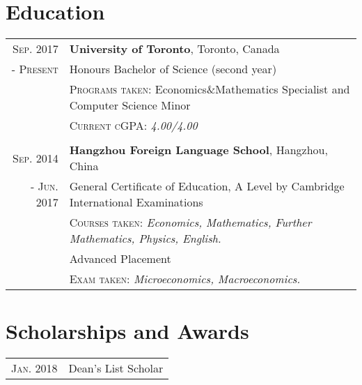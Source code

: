 \documentclass[a4paper,10pt]{article}
\begin{document}
\section{Education}
\begin{tabular}{rl}

    \textsc{Sep.} 2017 & \textbf{University of Toronto}, Toronto, Canada \\
    - \textsc{Present} & {Honours Bachelor of Science} (second year) \\
    & \quad \textsc{Programs taken: } Economics\&Mathematics Specialist and Computer Science Minor \\
    & \quad \textsc{Current cGPA: } \emph{4.00/4.00} 
    \\
    \quad
    \\
    \textsc{Sep.} 2014 & \textbf{Hangzhou Foreign Language School}, Hangzhou, China\\
    - \textsc{Jun.} 2017 & {General Certificate of Education, A Level by Cambridge International Examinations} \\
    & \quad \textsc{Courses taken}: \emph{Economics, Mathematics, Further Mathematics, Physics, English.} \\
    & {Advanced Placement} \\
    & \quad \textsc{Exam taken}: \emph{Microeconomics, Macroeconomics.} 


\end{tabular}

\section{Scholarships and Awards}
\begin{tabular}{rl}
    \textsc{Jan.} 2018 & Dean's List Scholar\\
\end{tabular}
\end{document}
